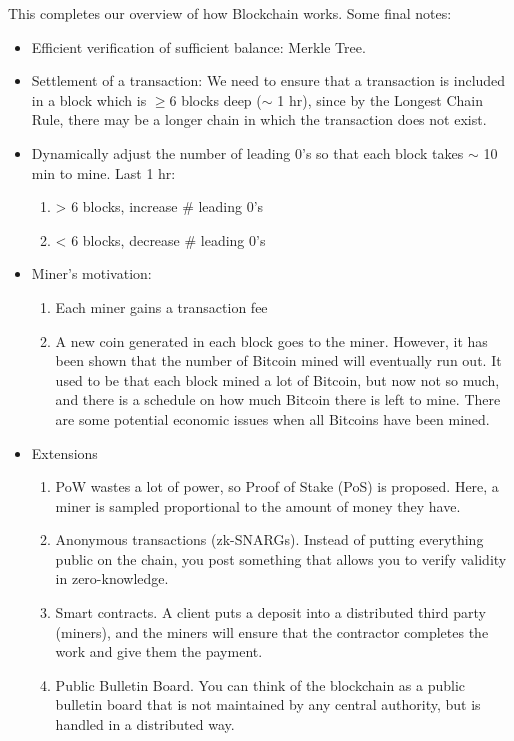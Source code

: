 This completes our overview of how Blockchain works. Some final notes:

\begin{itemize}
    \item Efficient verification of sufficient balance: Merkle Tree.
    \item Settlement of a transaction: We need to ensure that a transaction is included in a block which is $\geq 6$ blocks deep ($\sim$ 1 hr), since by the Longest Chain Rule, there may be a longer chain in which the transaction does not exist.
    \item Dynamically adjust the number of leading 0's so that each block takes $\sim$ 10 min to mine. Last 1 hr: \begin{enumerate}
        \item > 6 blocks, increase \# leading 0's
        \item < 6 blocks, decrease \# leading 0's
    \end{enumerate}
    \item Miner's motivation:\begin{enumerate}
        \item Each miner gains a transaction fee
        \item A new coin generated in each block goes to the miner. However, it has been shown that the number of Bitcoin mined will eventually run out. It used to be that each block mined a lot of Bitcoin, but now not so much, and there is a schedule on how much Bitcoin there is left to mine. There are some potential economic issues when all Bitcoins have been mined.
    \end{enumerate}
    \item Extensions \begin{enumerate}
        \item  PoW wastes a lot of power, so Proof of Stake (PoS) is proposed. Here, a miner is sampled proportional to the amount of money they have.
        \item Anonymous transactions (zk-SNARGs). Instead of putting everything public on the chain, you post something that allows you to verify validity in zero-knowledge.
        \item Smart contracts. A client puts a deposit into a distributed third party (miners), and the miners will ensure that the contractor completes the work and give them the payment.
        \item Public Bulletin Board. You can think of the blockchain as a public bulletin board that is not maintained by any central authority, but is handled in a distributed way.
    \end{enumerate}
\end{itemize}



